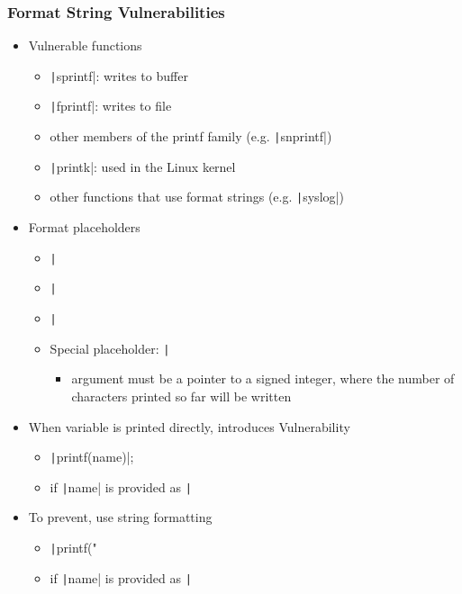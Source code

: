 \documentclass[final]{article}
\begin{document}
\subsubsection*{Format String Vulnerabilities}
\begin{itemize}
    \item Vulnerable functions
          \begin{itemize}[nosep]
              \item \texttt|sprintf|: writes to buffer
              \item \texttt|fprintf|: writes to file
              \item other members of the printf family (e.g. \texttt|snprintf|)
              \item \texttt|printk|: used in the Linux kernel
              \item other functions that use format strings (e.g. \texttt|syslog|)
          \end{itemize}
    \item Format placeholders
          \begin{itemize}[nosep]
              \item \texttt|%
              \item \texttt|%
              \item \texttt|%
              \item Special placeholder: \texttt|%
                    \begin{itemize}[nosep]
                        \item argument must be a pointer to a signed integer, where the number of characters printed so far will be written
                    \end{itemize}
          \end{itemize}
    \item When variable is printed directly, introduces Vulnerability
          \begin{itemize}[nosep]
              \item \texttt|printf(name)|;
              \item if \texttt|name| is provided as \texttt|%
          \end{itemize}
    \item To prevent, use string formatting
          \begin{itemize}[nosep]
              \item \texttt|printf("%
              \item if \texttt|name| is provided as \texttt|%
          \end{itemize}
\end{itemize}
\end{document}
